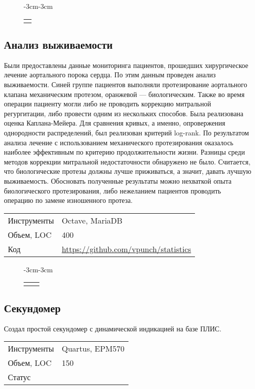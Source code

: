 \documentclass[a4paper]{article}
\makeatletter
\newenvironment{figcont}[1]{
    \begin{figure}[H]
        \begin{adjustwidth}{-3cm}{-3cm}
        \centering
        \begin{tabular}{*{#1}c}
}{
        \end{tabular}
        \end{adjustwidth}
    \end{figure}
}
\newcommand{\subfig}[2]{
    \subfloat[#1]{\texttt{[image: figs/\#2]}}
}
\newenvironment{props}{
    \begin{tabular}{@{}lN{8cm}@{}}
}{
    \end{tabular}
}
\makeatother
\begin{document}
\begin{figcont}{1}
    \subfig{Интерфейс программы}{taxidisp1}
\end{figcont}

\subsection*{Анализ выживаемости}

Были предоставлены данные мониторинга пациентов, прошедших хирургическое
лечение аортального порока сердца. По этим данным проведен анализ выживаемости.
Синей группе пациентов выполняли протезирование аортального клапана
механическим протезом, оранжевой --- биологическим. Также во время операции
пациенту могли либо не проводить коррекцию митральной регургитации, либо
провести одним из нескольких способов. Была реализована оценка Каплана-Мейера.
Для сравнения кривых, а именно, опровержения однородности распределений, был
реализован критерий log-rank. По результатом анализа лечение с использованием
механического протезирования оказалось наиболее эффективным по критерию
продолжительности жизни. Разницы среди методов коррекции митральной
недостаточности обнаружено не было. Считается, что биологические протезы должны
лучше приживаться, а значит, давать лучшую выживаемость. Обосновать полученные
результаты можно нехваткой опыта биологического протезирования, либо нежеланием
пациентов проводить операцию по замене изношенного протеза.

\begin{props}
    Инструменты & Octave, MariaDB \\
    Объем, LOC & 400 \\
    Код & \url{https://github.com/vpunch/statistics}
\end{props}

\begin{figcont}{2}
    \subfig{Статистика протезирования клапана}{survan1} &
    \subfig{Статистика коррекции регургитации}{survan2}
\end{figcont}

\subsection*{Секундомер}

Создал простой секундомер с динамической индикацией на базе ПЛИС.

\begin{props}
    Инструменты & Quartus, EPM570 \\
    Объем, LOC & 150 \\
    Статус & \closproj
\end{props}
\end{document}
